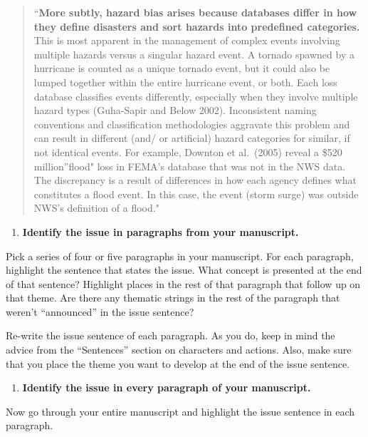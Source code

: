 \documentclass[]{tufte-book}
\providecommand{\tightlist}{%
  \setlength{\itemsep}{0pt}\setlength{\parskip}{0pt}}
\begin{document}
\begin{quote}
``\textbf{More subtly, hazard bias arises because databases differ in how
they define disasters and sort hazards into predefined categories.} This is
most apparent in the management of complex events involving multiple hazards
versus a singular hazard event. A tornado spawned by a hurricane is counted as a
unique tornado event, but it could also be lumped together within the entire
hurricane event, or both. Each loss database classifies events differently,
especially when they involve multiple hazard types (Guha-Sapir and Below 2002).
Inconsistent naming conventions and classification methodologies aggravate this
problem and can result in different (and/ or artificial) hazard categories for
similar, if not identical events. For example, Downton et al.~(2005) reveal a
\$520 million''flood" loss in FEMA's database that was not in the NWS data. The
discrepancy is a result of differences in how each agency defines what
constitutes a flood event. In this case, the event (storm surge) was outside
NWS's definition of a flood."
\end{quote}

\begin{enumerate}
\def\labelenumi{\arabic{enumi}.}
\setcounter{enumi}{4}
\tightlist
\item
  \textbf{Identify the issue in paragraphs from your manuscript.}
\end{enumerate}

Pick a series of four or five paragraphs in your manuscript. For each paragraph,
highlight the sentence that states the issue. What concept is presented at the end
of that sentence? Highlight places in the rest of that paragraph that
follow up on that theme. Are there any thematic strings in the rest of the
paragraph that weren't ``announced'' in the issue sentence?

Re-write the issue sentence of each paragraph. As you do, keep in mind the
advice from the ``Sentences'' section on characters and actions. Also, make sure
that you place the theme you want to develop at the end of the issue sentence.

\begin{enumerate}
\def\labelenumi{\arabic{enumi}.}
\setcounter{enumi}{5}
\tightlist
\item
  \textbf{Identify the issue in every paragraph of your manuscript.}
\end{enumerate}

Now go through your entire manuscript and highlight the issue sentence in each
paragraph.
\end{document}

